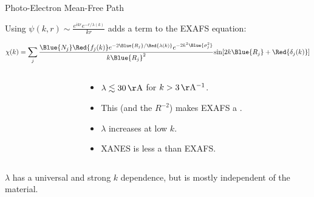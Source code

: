 \begin{slide}{Photo-Electron Mean-Free Path}

Using  {$\displaystyle \psi(k,r) \sim \frac{e^{ikr} e^{-r/\lambda(k)}}{kr} $ }
adds a term to the EXAFS equation:
\vmm

    \[ \chi(k) = \sum_j {\frac{{\Blue{N_j}} {\Red{f_j(k)}}
        e^{-2{\Blue{R_j}}/{\Red{\lambda(k)}}}
        e^{-2k^2{\Blue{\sigma_j^2}}}}{k{\Blue{R_j}}^2}
      {\sin[{2k{\Blue{R_j}} + {\Red{\delta_j(k)}}] }}} \]

\vmm\pause

\begin{columns}
  \begin{column}{58mm}
  \end{column}
  \begin{column}{58mm}

  \begin{itemize}
  \item  $\lambda \lesssim 30\,\rm\AA$  for $k > 3\rm\,\AA^{-1}$.

  \item This (and the $R^{-2}$) makes EXAFS a {}.
  \item  $\lambda $ increases at low $k$. \par 

  \item XANES is less a {} than EXAFS.
  \end{itemize}
  \end{column}
\end{columns}

\vmm

$\lambda$ has a universal and strong $k$ dependence, but is mostly
independent of the material.


\end{slide}
